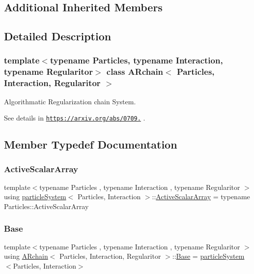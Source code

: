 \subsection*{Additional Inherited Members}


\subsection{Detailed Description}
\subsubsection*{template$<$typename Particles, typename Interaction, typename Regularitor$>$\newline
class A\+Rchain$<$ Particles, Interaction, Regularitor $>$}

Algorithmatic Regularization chain System. 

See details in \href{https://arxiv.org/abs/0709.3367}{\tt https\+://arxiv.\+org/abs/0709.} . 

\subsection{Member Typedef Documentation}
\mbox{\label{class_a_rchain_adeaa416917733980026d138dfde2f7ab}} 
\subsubsection{\texorpdfstring{Active\+Scalar\+Array}{ActiveScalarArray}}
{\footnotesize\ttfamily template$<$typename Particles , typename Interaction , typename Regularitor $>$ \\
using \mbox{\hyperlink{classparticle_system}{particle\+System}}$<$ Particles, Interaction $>$\+::\mbox{\hyperlink{classparticle_system_adeaa416917733980026d138dfde2f7ab}{Active\+Scalar\+Array}} =  typename Particles\+::\+Active\+Scalar\+Array}

\mbox{\label{class_a_rchain_a59c554d5529dc8d1558eb263699bfa24}} 
\subsubsection{\texorpdfstring{Base}{Base}}
{\footnotesize\ttfamily template$<$typename Particles , typename Interaction , typename Regularitor $>$ \\
using \mbox{\hyperlink{class_a_rchain}{A\+Rchain}}$<$ Particles, Interaction, Regularitor $>$\+::\mbox{\hyperlink{class_a_rchain_a59c554d5529dc8d1558eb263699bfa24}{Base}} =  \mbox{\hyperlink{classparticle_system}{particle\+System}}$<$Particles, Interaction$>$}

